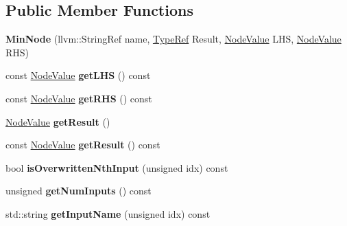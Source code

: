 \subsection*{Public Member Functions}
\begin{DoxyCompactItemize}
\item 
\mbox{\label{classglow_1_1_min_node_ad11ba9f3a9d9b8d717746e2d28a0802a}} 
{\bfseries Min\+Node} (llvm\+::\+String\+Ref name, \hyperlink{structglow_1_1_type}{Type\+Ref} Result, \hyperlink{structglow_1_1_node_value}{Node\+Value} L\+HS, \hyperlink{structglow_1_1_node_value}{Node\+Value} R\+HS)
\item 
\mbox{\label{classglow_1_1_min_node_a94de95be9f23576f0c360b8295139975}} 
const \hyperlink{structglow_1_1_node_value}{Node\+Value} {\bfseries get\+L\+HS} () const
\item 
\mbox{\label{classglow_1_1_min_node_a3fc31b118173b5ba81670bcc7986bed8}} 
const \hyperlink{structglow_1_1_node_value}{Node\+Value} {\bfseries get\+R\+HS} () const
\item 
\mbox{\label{classglow_1_1_min_node_a70740a7ad244d55cbce1f2871c955a81}} 
\hyperlink{structglow_1_1_node_value}{Node\+Value} {\bfseries get\+Result} ()
\item 
\mbox{\label{classglow_1_1_min_node_ad1c56d0a026c45ec50fc5c3d9667853b}} 
const \hyperlink{structglow_1_1_node_value}{Node\+Value} {\bfseries get\+Result} () const
\item 
\mbox{\label{classglow_1_1_min_node_a0092f51239a39a06f39e850643a07c8c}} 
bool {\bfseries is\+Overwritten\+Nth\+Input} (unsigned idx) const
\item 
\mbox{\label{classglow_1_1_min_node_ac2eb3ed04d185ef7f1849dd143fb11ab}} 
unsigned {\bfseries get\+Num\+Inputs} () const
\item 
\mbox{\label{classglow_1_1_min_node_a1253351044e2a6e51c94ee88ee6beee0}} 
std\+::string {\bfseries get\+Input\+Name} (unsigned idx) const
\item 
\mbox{\label{classglow_1_1_min_node_a679e468d1518102eed262124fc1837bc}} 

\end{DoxyCompactItemize}
